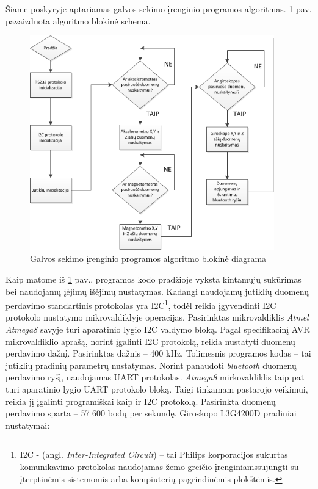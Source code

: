 \documentclass[]{vgtuef}
\begin{document}
{Šiame poskyryje aptariamas galvos sekimo įrenginio programos algoritmas. \ref{fig:head_tracker} pav. pavaizduota algoritmo blokinė schema.

\begin{figure}[!ht]
  \centering
  \includegraphics[width=400px]{img/head_tracker.png}
  \caption{Galvos sekimo įrenginio programos algoritmo blokinė diagrama}
  \label{fig:head_tracker}
\end{figure}

Kaip matome iš \ref{fig:head_tracker} pav., programos kodo pradžioje vyksta kintamųjų sukūrimas bei naudojamų įėjimų išėjimų nustatymas. Kadangi naudojamų jutiklių duomenų perdavimo standartinis protokolas yra I2C\footnote{  I2C - (angl. \textit{Inter-Integrated Circuit}) -- tai Philips korporacijos sukurtas komunikavimo protokolas naudojamas žemo greičio įrenginiamssujungti su įterptinėmis sistemomis arba kompiuterių pagrindinėmis plokštėmis.}, todėl reikia įgyvendinti I2C protokolo nustatymo mikrovaldiklyje operacijas. Pasirinktas mikrovaldiklis \textit{Atmel Atmega8} savyje turi aparatinio lygio I2C valdymo bloką. Pagal specifikacinį AVR mikrovaldiklio aprašą, norint įgalinti I2C protokolą, reikia nustatyti duomenų perdavimo dažnį. Pasirinktas dažnis – 400 kHz. Tolimesnis programos kodas – tai jutiklių pradinių parametrų nustatymas. Norint panaudoti \textit{bluetooth} duomenų perdavimo ryšį, naudojamas UART protokolas. \textit{Atmega8} mirkovaldiklis taip pat turi aparatinio lygio UART protokolo bloką. Taigi tinkamam pastarojo veikimui, reikia jį įgalinti programiškai kaip ir I2C protokolą. Pasirinkta duomenų perdavimo sparta – 57 600 bodų per sekundę.
Giroskopo L3G4200D pradiniai nustatymai:

}
\end{document}
